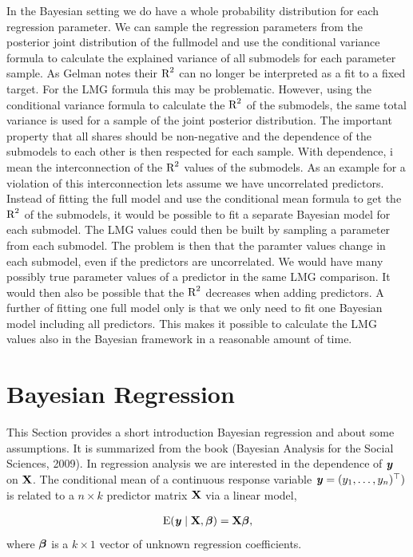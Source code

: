 \documentclass[11pt,a4paper,twoside]{book}\usepackage[]{graphicx}\usepackage[]{color}
\begin{document}
In the Bayesian setting we do have a whole probability distribution for each regression parameter. We can sample the regression parameters from the posterior joint distribution of the fullmodel and use the conditional variance formula to calculate the explained variance of all submodels for each parameter sample. As Gelman notes their $\text{R}^2$ can no longer be interpreted as a fit to a fixed target. For the LMG formula this may be problematic. However, using the conditional variance formula to calculate the $\text{R}^2$ of the submodels, the same total variance is used for a sample of the joint posterior distribution. The important property that all shares should be non-negative and the dependence of the submodels to each other is then respected for each sample. With dependence, i mean the interconnection of the $\text{R}^2$ values of the submodels. As an example for a violation of this interconnection lets assume we have uncorrelated predictors. Instead of fitting the full model and use the conditional mean formula to get the $\text{R}^2$ of the submodels,  it would be possible to fit a separate Bayesian model for each submodel. The LMG values could then be built by sampling a parameter from each submodel. The problem is then that the paramter values change in each submodel, even if the predictors are uncorrelated. We would have many possibly true parameter values of a predictor in the same LMG comparison. It would then also be possible that the $\text{R}^2$ decreases when adding predictors.  
A further of fitting one full model only  is that we only need to fit one Bayesian model including all predictors. This makes it possible to calculate the LMG values also in the Bayesian framework in a reasonable amount of time. 


\section{Bayesian Regression}
This Section provides a short introduction Bayesian regression and about some assumptions. It is summarized from the book (Bayesian Analysis for the Social Sciences, 2009). 
In regression analysis we are interested in the dependence of ${\textbf{\textit{y}}}$ on ${\mathbf{X}}$. The conditional mean of a continuous response variable ${\textbf{\textit{y}}} = (y_{1}, \dots, y_{n})^\top)$ is related to a $n \times k$ predictor matrix ${\mathbf{X}}$ via a linear model, 

       \begin{align} 
\operatorname{E}({\textbf{\textit{y}}} \mid {\mathbf{X}} , {\boldsymbol{\beta}}) = {\mathbf{X}} {\boldsymbol{\beta}} ,
   \end{align}
where ${\boldsymbol{\beta}}$ is a $k \times 1$ vector of unknown regression coefficients.
\end{document}
